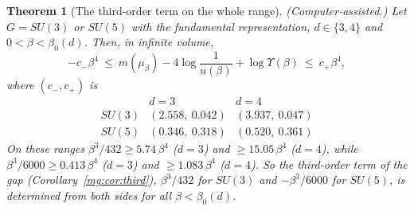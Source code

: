 \documentclass[11pt,a4paper]{article}
\newtheorem{theorem}{Theorem}[section]
\theoremstyle{definition}
\theoremstyle{remark}
\begin{document}
\begin{theorem}[The third-order term on the whole range]\label{mg:thm:thirdcap}
(Computer-assisted.) Let $G=SU(3)$ or $SU(5)$ with the fundamental representation, $d\in\{3,4\}$ and $0<\beta<\beta_0(d)$. Then, in infinite volume,
\[
-c_-\beta^4\ \le\ m(\mu_\beta)-4\log\frac1{u(\beta)}+\log\Upsilon(\beta)\ \le\ c_+\beta^4,
\]
where $(c_-,c_+)$ is
\[
\begin{array}{lcc}
 & d=3 & d=4\\
SU(3) & (2.558,\ 0.042) & (3.937,\ 0.047)\\
SU(5) & (0.346,\ 0.318) & (0.520,\ 0.361)
\end{array}
\]
On these ranges $\beta^3/432\ge5.74\,\beta^4$ ($d=3$) and $\ge15.05\,\beta^4$ ($d=4$), while $\beta^3/6000\ge0.413\,\beta^4$ ($d=3$) and $\ge1.083\,\beta^4$ ($d=4$). So the third-order term
of the gap (Corollary~\ref{mg:cor:third}), $\beta^3/432$ for $SU(3)$ and $-\beta^3/6000$ for $SU(5)$, is determined from both sides for all $\beta<\beta_0(d)$.
\end{theorem}
\end{document}
